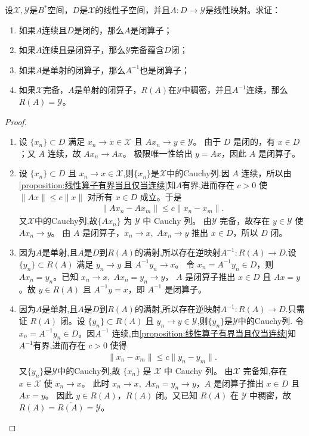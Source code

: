 \documentclass[../../main.tex]{subfiles}%
\begin{document}
\begin{example}
设$\mathscr{X},\mathscr{Y}$是$B^*$空间，$D$是$\mathscr{X}$的线性子空间，并且$A:D\to\mathscr{Y}$是线性映射。求证：
\begin{enumerate}[(1)]
\item 如果$A$连续且$D$是闭的，那么$A$是闭算子；
\item 如果$A$连续且是闭算子，那么$\mathscr{Y}$完备蕴含$D$闭；
\item 如果$A$是单射的闭算子，那么$A^{-1}$也是闭算子；
\item 如果$\mathscr{X}$完备，$A$是单射的闭算子，$R(A)$在$\mathscr{Y}$中稠密，并且$A^{-1}$连续，那么$R(A)=\mathscr{Y}$。
\end{enumerate}
\end{example}
\begin{proof}
\begin{enumerate}[(1)]
\item 设 $\{x_n\}\subset D$ 满足 $x_n\to x\in\mathscr{X}$ 且 $Ax_n\to y\in\mathscr{Y}$。
由于 $D$ 是闭的，有 $x\in D$；又 $A$ 连续，故 $Ax_n\to Ax$。
极限唯一性给出 $y=Ax$，因此 $A$ 是闭算子。

\item 设 $\{x_n\}\subset D$ 且 $x_n\to x\in\mathscr{X}$,则$\{x_n\}$是$\mathscr{X}$中的Cauchy列.因 $A$ 连续，所以由\cref{proposition:线性算子有界当且仅当连续}知$A$有界,进而存在 $c>0$ 使
$\|Ax\|\leqslant c\|x\|$ 对所有 $x\in D$ 成立。于是
\begin{align*}
\|Ax_n-Ax_m\|\leqslant c\|x_n-x_m\|.
\end{align*}
又$\mathscr{X}$中的Cauchy列,故$\{Ax_n\}$ 为 $\mathscr{Y}$ 中 Cauchy 列。
由$\mathscr{Y}$ 完备，故存在 $y\in\mathscr{Y}$ 使 $Ax_n\to y$。
由 $A$ 是闭算子，$x_n\to x,\;Ax_n\to y$ 推出 $x\in D$，所以 $D$ 闭。

\item 因为$A$是单射,且$A$是$D$到$R(A)$的满射,所以存在逆映射$A^{-1}:R(A)\to D$.设 $\{y_n\}\subset R(A)$ 满足 $y_n\to y$ 且 $A^{-1}y_n\to x$。
令 $x_n=A^{-1}y_n\in D$，则 $Ax_n=y_n$。已知 $x_n\to x,\;Ax_n=y_n\to y$，
$A$ 是闭算子推出 $x\in D$ 且 $Ax=y$。故 $y\in R(A)$ 且 $A^{-1}y=x$，即 $A^{-1}$ 是闭算子。

\item 因为$A$是单射,且$A$是$D$到$R(A)$的满射,所以存在逆映射$A^{-1}:R(A)\to D$.只需证 $R(A)$ 闭。设 $\{y_n\}\subset R(A)$ 且 $y_n\to y\in\mathscr{Y}$,则$\{y_n\}$是$\mathscr{Y}$中的Cauchy列.
令 $x_n=A^{-1}y_n\in D$。因$A^{-1}$ 连续,由\cref{proposition:线性算子有界当且仅当连续}知$A^{-1}$有界,进而存在 $c>0$ 使得
\begin{align*}
\|x_n-x_m\|\leqslant c\|y_n-y_m\|.
\end{align*}
又$\{y_n\}$是$\mathscr{Y}$中的Cauchy列,故 $\{x_n\}$ 是 $\mathscr{X}$ 中 Cauchy 列。
由$\mathscr{X}$ 完备知,存在 $x\in\mathscr{X}$ 使 $x_n\to x$。
此时 $x_n\to x,\;Ax_n=y_n\to y$，$A$ 是闭算子推出 $x\in D$ 且 $Ax=y$。
因此 $y\in R(A)$，$R(A)$ 闭。又已知 $R(A)$ 在 $\mathscr{Y}$ 中稠密，故 $R(A)=\overline{R(A)}=\mathscr{Y}$。
\end{enumerate}
\end{proof}
\end{document}
